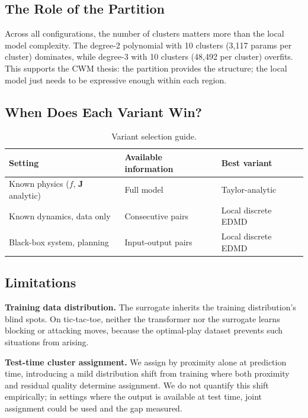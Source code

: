 \documentclass[11pt]{article}
\theoremstyle{definition}
\newcommand{\Jv}{\boldsymbol{J}}
\begin{document}
\subsection{The Role of the Partition}

Across all configurations, the number of clusters matters more than the local model complexity. The degree-2 polynomial with 10 clusters (3,117 params per cluster) dominates, while degree-3 with 10 clusters (48,492 per cluster) overfits. This supports the CWM thesis: the partition provides the structure; the local model just needs to be expressive enough within each region.

\subsection{When Does Each Variant Win?}

\begin{table}[H]
\centering\small
\begin{tabular}{lll}
\toprule
Setting & Available information & Best variant \\
\midrule
Known physics ($f$, $\Jv$ analytic) & Full model & Taylor-analytic \\
Known dynamics, data only & Consecutive pairs & Local discrete EDMD \\
Black-box system, planning & Input-output pairs & Local discrete EDMD \\
\bottomrule
\end{tabular}
\caption{Variant selection guide.}
\end{table}

\subsection{Limitations}

\textbf{Training data distribution.} The surrogate inherits the training distribution's blind spots. On tic-tac-toe, neither the transformer nor the surrogate learns blocking or attacking moves, because the optimal-play dataset prevents such situations from arising.

\textbf{Test-time cluster assignment.} We assign by proximity alone at prediction time, introducing a mild distribution shift from training where both proximity and residual quality determine assignment. We do not quantify this shift empirically; in settings where the output is available at test time, joint assignment could be used and the gap measured.
\end{document}
